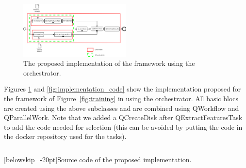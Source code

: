 \documentclass[10pt, conference, compsocconf]{IEEEtran}
\begin{document}
\begin{figure}[H]
\centering
\includegraphics[width=0.5\textwidth]{Figures/implementation.png}
\caption{The proposed implementation of the framework using the orchestrator.}
\label{fig:implementation_diagram}
\end{figure}

Figures \ref{fig:implementation_diagram} and \ref{fig:implementation_code} show the implementation proposed for the framework of Figure~\ref{fig:training} in using the orchestrator. All basic blocs are created using the above subclasses and are combined using QWorkflow and QParallelWork. Note that we added a QCreateDisk after QExtractFeaturesTask to add the code needed for selection (this can be avoided by putting the code in the docker repository used for the tasks).

\begin{mdframed}[backgroundcolor=LightGray,topline=false, bottomline=false,leftline=false, rightline=false]
\inputminted[baselinestretch=.8, fontsize=\scriptsize]{python}{selection.py}
\end{mdframed}
[belowskip=-20pt]{Source code of the proposed implementation.}
\label{fig:implementation_code}
\end{document}
